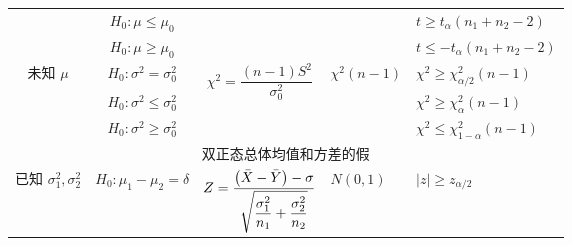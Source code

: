 \begin{table}[H]
{\begin{tabular}{cccll}
                                                          & $H_0:\mu\leqslant \mu_0$             &                                                                                                                   &                                                                                  & $t\geqslant t_{\alpha}(n_1+n_2-2)$       \\
                                                          & $H_0:\mu\geqslant \mu_0$             &                                                                                                                   &                                                                                  & $t\leqslant -t_{\alpha}(n_1+n_2-2)$      \\
            \midrule
            \multirow{3}{*}{未知 $\mu$}                   & $H_0:\sigma^2=\sigma_0^2$            & \multirow{3}{*}{$\chi^2=\dfrac{(n-1)S^2}{\sigma_0^2}$}                                                            & \multirow{3}{*}{$\chi^2(n-1)$}                                                   & $\chi^2\geqslant \chi^2_{\alpha/2}(n-1)$ \\
                                                          & $H_0:\sigma^2\leqslant \sigma_0^2$   &                                                                                                                   &                                                                                  & $\chi^2\geqslant \chi^2_\alpha(n-1)$     \\
                                                          & $H_0:\sigma^2\geqslant \sigma_0^2$   &                                                                                                                   &                                                                                  & $\chi^2\leqslant \chi^2_{1-\alpha}(n-1)$ \\
            \midrule
            \multicolumn{5}{c}{双正态总体均值和方差的假}                                                                                                                                                                                                                                                                                           \\
            \midrule
            \multirow{3}{*}{已知 $\sigma_1^2,\sigma_2^2$} & $H_0:\mu_1-\mu_2=\delta$             & \multirow{3}{*}{$Z=\dfrac{\qty(\bar{X}-\bar{Y})-\sigma}{\sqrt{\dfrac{\sigma_1^2}{n_1}+\dfrac{\sigma_2^2}{n_2}}}$} & \multirow{3}{*}{$N(0,1)$}                                                        & $|z|\geqslant z_{\alpha/2}$              \\

\end{tabular}}
\end{table}
